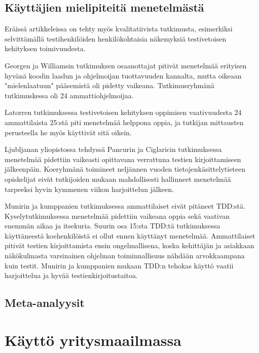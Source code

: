 \documentclass[finnish]{tktltiki2}
\theoremstyle{definition}
\theoremstyle{remark}
\begin{document}
\subsection{Käyttäjien mielipiteitä menetelmästä}

Eräissä artikkeleissa on tehty myös kvalitatiivista tutkimusta, esimerkiksi selvittämällä testihenkilöiden henkilökohtaisia näkemyksiä testivetoisen kehityksen toimivuudesta.

Georgen ja Williamsin \cite{George04} tutkimuksen osaanottajat pitivät menetelmää erityisen hyvänä koodin laadun ja ohjelmoijan tuottavuuden kannalta, mutta oikeaan "mielenlaatuun" pääsemistä oli pidetty vaikeana. Tutkimusryhmänä tutkimuskessa oli 24 ammattiohjelmoijaa.

Latorren \cite{Latorre14} tutkimuksessa testivetoisen kehityksen oppimisen vaativuudesta 24 ammattilaista 25:stä piti menetelmää helppona oppia, ja tutkijan mittausten perusteella he myös käyttivät sitä oikein.

Ljubljanan yliopistossa tehdyssä Pancurin ja Ciglaricin\cite{Pancur11} tutkimuksessa menetelmää pidettiin vaikeasti opittavana verrattuna testien kirjoittamiseen jälkeenpäin. Koeryhmänä toimineet neljännen vuoden tietojenkäsittelytieteen opiskelijat eivät tutkijoiden mukaan mahdollisesti hallinneet menetelmää tarpeeksi hyvin kymmenen viikon harjoittelun jälkeen.

Munirin ja kumppanien \cite{Munir14} tutkimuksessa ammattilaiset eivät pitäneet TDD:stä. Kyselytutkimuksessa menetelmää pidettiin vaikeana oppia sekä vaativan enemmän aikaa ja itsekuria. Suurin osa 15:sta TDD:tä tutkimuksessa käyttäneestä koehenkilöistä ei ollut ennen käyttänyt menetelmää. Ammattilaiset pitivät testien kirjoittamista ensin ongelmallisena, koska kehittäjän ja asiakkaan näkökulmasta varsinainen ohjelman toiminnallisuus nähdään arvokkaampana kuin testit. Munirin ja kumppanien mukaan TDD:n tehokas käyttö vaatii harjoittelua ja hyvää testienkirjoitustaitoa.




\subsection{Meta-analyysit}




\section{Käyttö yritysmaailmassa}
\end{document}
